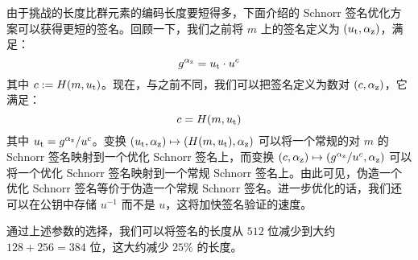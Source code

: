由于挑战的长度比群元素的编码长度要短得多，下面介绍的 Schnorr 签名优化方案可以获得更短的签名。回顾一下，我们之前将 $m$ 上的签名定义为 $(u_{\rm t},\alpha_{\rm z})$，满足：
\[
g^{\alpha_{\rm z}}=u_{\rm t}\cdot u^c
\]
其中 $c:=H(m,u_{\rm t})$。现在，与之前不同，我们可以把签名定义为数对 $(c,\alpha_{\rm z})$，它满足：
\[
c=H(m,u_{\rm t})
\]
其中 $u_{\rm t}={g^{\alpha_{\rm z}}}/{u^c}$。变换 $(u_{\rm t},\alpha_{\rm z})\mapsto(H(m,u_{\rm t}),\alpha_{\rm z})$ 可以将一个常规的对 $m$ 的 Schnorr 签名映射到一个优化 Schnorr 签名上，而变换 $(c,\alpha_{\rm z})\mapsto({g^{\alpha_{\rm z}}}/{u^c},\alpha_{\rm z})$ 可以将一个优化 Schnorr 签名映射到一个常规 Schnorr 签名上。由此可见，伪造一个优化 Schnorr 签名等价于伪造一个常规 Schnorr 签名。进一步优化的话，我们还可以在公钥中存储 $u^{-1}$ 而不是 $u$，这将加快签名验证的速度。

通过上述参数的选择，我们可以将签名的长度从 $512$ 位减少到大约 $128+256=384$ 位，这大约减少 $25\%$ 的长度。